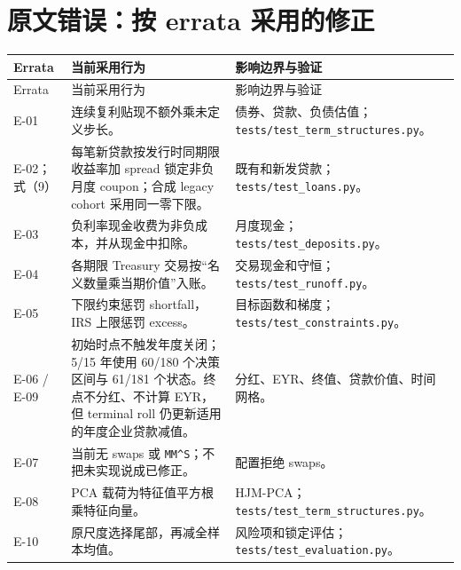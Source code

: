 \documentclass[UTF8,10pt,a4paper,fontset=fandol]{ctexart}
\begin{document}
\section{原文错误：按 errata 采用的修正}
\begin{longtable}{@{}P{14mm}P{72mm}P{70mm}@{}}
\toprule
Errata & 当前采用行为 & 影响边界与验证 \\
\midrule
\endfirsthead
\toprule Errata & 当前采用行为 & 影响边界与验证 \\ \midrule
\endhead
E-01 & 连续复利贴现不额外乘未定义步长。 & 债券、贷款、负债估值；\texttt{tests/test\_term\_structures.py}。 \\
E-02；式（9） & 每笔新贷款按发行时同期限收益率加 spread 锁定非负月度 coupon；合成 legacy cohort 采用同一零下限。 & 既有和新发贷款；\texttt{tests/test\_loans.py}。 \\
E-03 & 负利率现金收费为非负成本，并从现金中扣除。 & 月度现金；\texttt{tests/test\_deposits.py}。 \\
E-04 & 各期限 Treasury 交易按“名义数量乘当期价值”入账。 & 交易现金和守恒；\texttt{tests/test\_runoff.py}。 \\
E-05 & 下限约束惩罚 shortfall，IRS 上限惩罚 excess。 & 目标函数和梯度；\texttt{tests/test\_constraints.py}。 \\
E-06 / E-09 & 初始时点不触发年度关闭；5/15 年使用 60/180 个决策区间与 61/181 个状态。终点不分红、不计算 EYR，但 terminal roll 仍更新适用的年度企业贷款减值。 & 分红、EYR、终值、贷款价值、时间网格。 \\
E-07 & 当前无 swaps 或 \texttt{MM\textasciicircum S}；不把未实现说成已修正。 & 配置拒绝 swaps。 \\
E-08 & PCA 载荷为特征值平方根乘特征向量。 & HJM-PCA；\texttt{tests/test\_term\_structures.py}。 \\
E-10 & 原尺度选择尾部，再减全样本均值。 & 风险项和锁定评估；\texttt{tests/test\_evaluation.py}。 \\
\bottomrule
\end{longtable}
\end{document}

